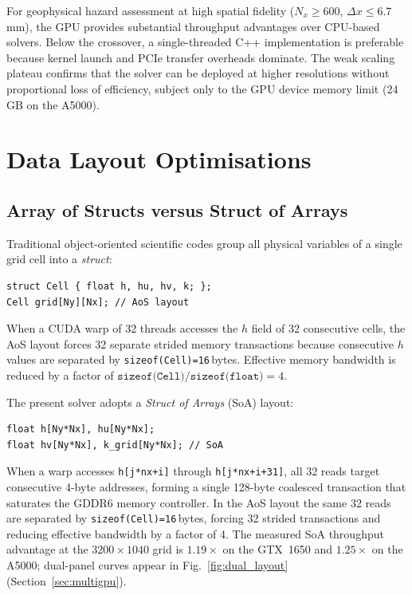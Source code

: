 \documentclass[10pt, conference]{FMFP2023}
\begin{document}
For geophysical hazard assessment at high spatial fidelity
($N_x\geq600$, $\Delta x\leq6.7$\,mm), the GPU provides
substantial throughput advantages over CPU-based solvers.
Below the crossover, a single-threaded C++ implementation
is preferable because kernel launch and PCIe transfer
overheads dominate.
The weak scaling plateau confirms that the solver can be
deployed at higher resolutions without proportional loss
of efficiency, subject only to the GPU device memory
limit (24\,GB on the A5000).

\section{Data Layout Optimisations}
\label{sec:datalayout}

\subsection{Array of Structs versus Struct of Arrays}

Traditional object-oriented scientific codes group all
physical variables of a single grid cell into a
\emph{struct}:
\begin{verbatim}
struct Cell { float h, hu, hv, k; };
Cell grid[Ny][Nx]; // AoS layout
\end{verbatim}
When a CUDA warp of 32 threads accesses the $h$ field of
32 consecutive cells, the AoS layout forces 32 separate
strided memory transactions because consecutive $h$ values
are separated by \texttt{sizeof(Cell)=16}\,bytes.
Effective memory bandwidth is reduced by a factor of
$\texttt{sizeof(Cell)}/\texttt{sizeof(float)}=4$.

The present solver adopts a \emph{Struct of Arrays} (SoA)
layout:
\begin{verbatim}
float h[Ny*Nx], hu[Ny*Nx];
float hv[Ny*Nx], k_grid[Ny*Nx]; // SoA
\end{verbatim}
When a warp accesses \texttt{h[j*nx+i]} through
\texttt{h[j*nx+i+31]}, all 32 reads target consecutive
4-byte addresses, forming a single 128-byte coalesced
transaction that saturates the GDDR6 memory controller.
In the AoS layout the same 32 reads are separated by
\texttt{sizeof(Cell)=16}\,bytes, forcing 32 strided
transactions and reducing effective bandwidth by a factor
of 4.
The measured SoA throughput advantage at the $3200\times1040$
grid is $1.19\times$ on the GTX~1650 and $1.25\times$ on
the A5000; dual-panel curves appear in
Fig.~\ref{fig:dual_layout} (Section~\ref{sec:multigpu}).
\end{document}
